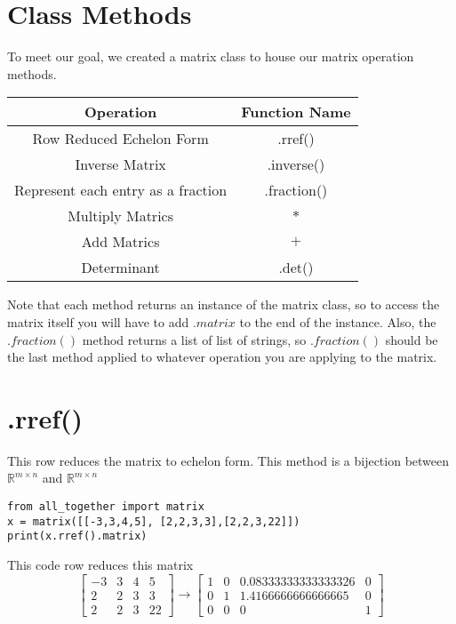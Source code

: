 \documentclass{article}
\begin{document}
\section{Class Methods}
To meet our goal, we created a matrix class to house our matrix operation methods. 
\begin{center}
\begin{tabular}{||c|c||}
    \hline
    Operation & Function Name \\ [0.5ex]
    \hline\hline
    Row Reduced Echelon Form & .rref() \\
    Inverse Matrix & .inverse() \\
    Represent each entry as a fraction & .fraction() \\
    Multiply Matrics & \(*\) \\
    Add Matrics & \(+\) \\ 
    Determinant & .det() \\[1ex] 
    \hline 
\end{tabular}
\end{center}
Note that each method returns an instance of the matrix class, so to access the matrix itself you will have to add \(.matrix\) to the end of the instance. 
Also, the \(.fraction()\) method returns a list of list of strings, so \(.fraction()\) should be the last method applied to whatever operation you are applying to the
matrix. 

\section{.rref()}
This row reduces the matrix to echelon form. This method is a bijection between \(\mathbb{R}^{m \times n}\) and \(\mathbb{R}^{m \times n}\)
\begin{lstlisting}
from all_together import matrix
x = matrix([[-3,3,4,5], [2,2,3,3],[2,2,3,22]])
print(x.rref().matrix) 
\end{lstlisting}
This code row reduces this matrix 
\begin{equation}
\left[
\begin{array}{cccc}
    -3 & 3 & 4 &5   \\
     2&2&3&3 \\
     2&2&3&22
\end{array}
\right]
\rightarrow
\left[
\begin{array}{cccc}
    1 & 0 & 0.08333333333333326 &0   \\
     0&1& 1.4166666666666665&0 \\
     0&0&0&1
\end{array}
\right]
\end{equation}
\end{document}
